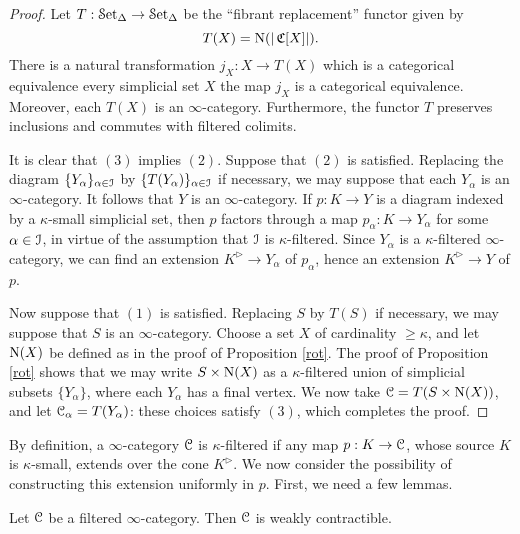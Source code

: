 \begin{proof}
Let $T: \operatorname{\mathcal{S}et_{\Delta}} \rightarrow \operatorname{\mathcal{S}et_{\Delta}}$ be the ``fibrant replacement'' functor given by
$$ T(X) = \operatorname{N}( | \operatorname{\mathfrak{C}}[X] |).$$
There is a natural transformation $j_{X}: X \rightarrow T(X)$ which is a categorical equivalence every simplicial set $X$ the map $j_{X}$ is a categorical equivalence. Moreover, each $T(X)$ is an $\infty$-category. Furthermore, the functor $T$ preserves inclusions and commutes with filtered colimits.

It is clear that $(3)$ implies $(2)$. Suppose that $(2)$ is satisfied. Replacing the diagram
$\{ Y_{\alpha} \}_{ \alpha \in \operatorname{\mathcal{I}}}$ by $\{ T(Y_{\alpha}) \}_{\alpha \in \operatorname{\mathcal{I}}}$ if necessary, we may suppose that each $Y_{\alpha}$ is an $\infty$-category. It follows that $Y$ is an $\infty$-category.
If $p: K \rightarrow Y$ is a diagram indexed by a $\kappa$-small simplicial set, then $p$ factors
through a map $p_{\alpha}: K \rightarrow Y_{\alpha}$ for some $\alpha \in \operatorname{\mathcal{I}}$, in virtue of the assumption that $\operatorname{\mathcal{I}}$ is $\kappa$-filtered. Since $Y_{\alpha}$ is a $\kappa$-filtered $\infty$-category, we can find an extension $K^{\triangleright} \rightarrow Y_{\alpha}$ of $p_{\alpha}$, hence an extension $K^{\triangleright} \rightarrow Y$ of $p$.

Now suppose that $(1)$ is satisfied. Replacing $S$ by $T(S)$ if necessary, we may suppose that $S$ is an $\infty$-category. Choose a set $X$ of cardinality $\geq \kappa$, and let $\operatorname{N}(X)$ be defined as in the proof of Proposition \ref{rot}. The proof of Proposition \ref{rot} shows that we may write $S \times \operatorname{N}(X)$ as a $\kappa$-filtered union of simplicial subsets $\{ Y_{\alpha} \}$, where
each $Y_{\alpha}$ has a final vertex. We now take $\operatorname{\mathcal{C}} = T(S \times \operatorname{N}(X) )$, and let
$\operatorname{\mathcal{C}}_{\alpha} = T(Y_{\alpha})$: these choices satisfy $(3)$, which completes the proof.
\end{proof}

By definition, a $\infty$-category $\operatorname{\mathcal{C}}$ is $\kappa$-filtered if any map $p: K \rightarrow \operatorname{\mathcal{C}}$, whose source $K$ is $\kappa$-small, extends over the cone $K^{\triangleright}$. We now consider the possibility of constructing this extension uniformly in $p$. First, we need a few lemmas.

\begin{lemma}\label{stull2}
Let $\operatorname{\mathcal{C}}$ be a filtered $\infty$-category. Then $\operatorname{\mathcal{C}}$ is weakly contractible.
\end{lemma}


